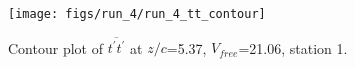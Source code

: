 \begin{figure}[H]
\centering
\texttt{[image: figs/run\_4/run\_4\_tt\_contour]}
\caption{Contour plot of $\overline{t^\prime t^\prime}$ at $z/c$=5.37, $V_{free}$=21.06, station 1.}
\label{fig:run_4_tt_contour}
\end{figure}


